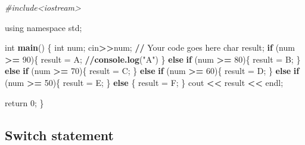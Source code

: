 \documentclass[
]{article}
\newenvironment{Shaded}{\begin{snugshade}}{\end{snugshade}}
\newcommand{\CommentTok}[1]{\textcolor[rgb]{0.56,0.35,0.01}{\textit{#1}}}
\newcommand{\ControlFlowTok}[1]{\textcolor[rgb]{0.13,0.29,0.53}{\textbf{#1}}}
\newcommand{\DecValTok}[1]{\textcolor[rgb]{0.00,0.00,0.81}{#1}}
\newcommand{\ErrorTok}[1]{\textcolor[rgb]{0.64,0.00,0.00}{\textbf{#1}}}
\newcommand{\FunctionTok}[1]{\textcolor[rgb]{0.13,0.29,0.53}{\textbf{#1}}}
\newcommand{\NormalTok}[1]{#1}
\newcommand{\OtherTok}[1]{\textcolor[rgb]{0.56,0.35,0.01}{#1}}
\newcommand{\SpecialCharTok}[1]{\textcolor[rgb]{0.81,0.36,0.00}{\textbf{#1}}}
\newcommand{\StringTok}[1]{\textcolor[rgb]{0.31,0.60,0.02}{#1}}
\begin{document}
\begin{Shaded}
\begin{Highlighting}[]
\CommentTok{\#include\textless{}iostream\textgreater{}}

\NormalTok{using namespace std;}

\NormalTok{int }\FunctionTok{main}\NormalTok{()  \{}
\NormalTok{    int num;}
\NormalTok{    cin}\SpecialCharTok{\textgreater{}}\ErrorTok{\textgreater{}}\NormalTok{num;}
    \SpecialCharTok{/}\ErrorTok{/}\NormalTok{ Your code goes here}
\NormalTok{    char result;}
    \ControlFlowTok{if}\NormalTok{ (num }\SpecialCharTok{\textgreater{}=} \DecValTok{90}\NormalTok{)\{}
\NormalTok{        result }\OtherTok{=} \StringTok{\textquotesingle{}A\textquotesingle{}}\NormalTok{;}
    \SpecialCharTok{/}\ErrorTok{/}\FunctionTok{console.log}\NormalTok{(}\StringTok{"A"}\NormalTok{)}
\NormalTok{    \}}
    \ControlFlowTok{else} \ControlFlowTok{if}\NormalTok{ (num }\SpecialCharTok{\textgreater{}=} \DecValTok{80}\NormalTok{)\{}
\NormalTok{        result }\OtherTok{=} \StringTok{\textquotesingle{}B\textquotesingle{}}\NormalTok{;}
\NormalTok{    \}}
    \ControlFlowTok{else} \ControlFlowTok{if}\NormalTok{ (num }\SpecialCharTok{\textgreater{}=} \DecValTok{70}\NormalTok{)\{}
\NormalTok{        result }\OtherTok{=} \StringTok{\textquotesingle{}C\textquotesingle{}}\NormalTok{;}
\NormalTok{    \}}
    \ControlFlowTok{else} \ControlFlowTok{if}\NormalTok{ (num }\SpecialCharTok{\textgreater{}=} \DecValTok{60}\NormalTok{)\{}
\NormalTok{        result }\OtherTok{=} \StringTok{\textquotesingle{}D\textquotesingle{}}\NormalTok{;}
\NormalTok{    \}}
    \ControlFlowTok{else} \ControlFlowTok{if}\NormalTok{ (num }\SpecialCharTok{\textgreater{}=} \DecValTok{50}\NormalTok{)\{}
\NormalTok{        result }\OtherTok{=} \StringTok{\textquotesingle{}E\textquotesingle{}}\NormalTok{;}
\NormalTok{    \}}
    \ControlFlowTok{else}\NormalTok{ \{}
\NormalTok{        result }\OtherTok{=} \StringTok{\textquotesingle{}F\textquotesingle{}}\NormalTok{;}
\NormalTok{    \}}
\NormalTok{    cout }\SpecialCharTok{\textless{}}\ErrorTok{\textless{}}\NormalTok{ result }\SpecialCharTok{\textless{}}\ErrorTok{\textless{}}\NormalTok{ endl;}

\NormalTok{    return }\DecValTok{0}\NormalTok{;}
\NormalTok{\}}
\end{Highlighting}
\end{Shaded}

\subsection{Switch statement}\label{switch-statement}
\end{document}
